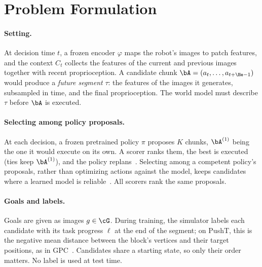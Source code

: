 \section{Problem Formulation}
\label{sec:problem}

\paragraph{Setting.}
At decision time $t$, a frozen encoder $\varphi$ maps the robot's images to patch features, and the context $C_t$ collects the features of the current and previous images together with recent proprioception.
A candidate chunk $\bA=(a_t,\dots,a_{t+\He-1})$ would produce a \emph{future segment} $\tau$: the features of the images it generates, subsampled in time, and the final proprioception.
The world model must describe $\tau$ before $\bA$ is executed.

\paragraph{Selecting among policy proposals.}
At each decision, a frozen pretrained policy $\pi$ proposes $K$ chunks, $\bA^{(1)}$ being the one it would execute on its own.
A scorer ranks them, the best is executed (ties keep $\bA^{(1)}$), and the policy replans~\cite{qi2025gpc,cui2026dreamsteer}.
Selecting among a competent policy's proposals, rather than optimizing actions against the model, keeps candidates where a learned model is reliable~\cite{janner2019mbpo,gao2023overoptimization}.
All scorers rank the same proposals.

\paragraph{Goals and labels.}
Goals are given as images $g\in\cG$.
During training, the simulator labels each candidate with its task progress $\ell$ at the end of the segment; on PushT, this is the negative mean distance between the block's vertices and their target positions, as in GPC~\cite{qi2025gpc}.
Candidates share a starting state, so only their order matters.
No label is used at test time.

